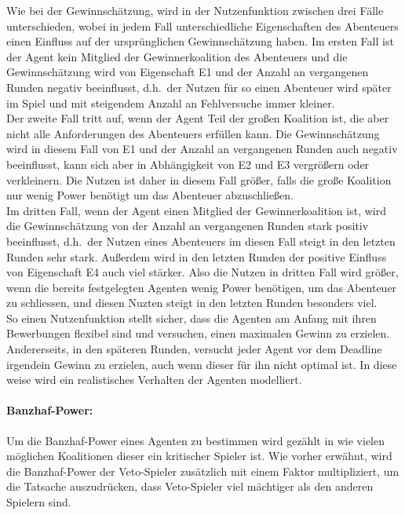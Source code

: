 \documentclass[fleqn,10pt]{article} %
\begin{document}
Wie bei der Gewinnschätzung, wird in der Nutzenfunktion zwischen drei Fälle unterschieden, wobei in jedem Fall unterschiedliche Eigenschaften des Abenteuers einen Einfluss auf der ursprünglichen Gewinnschätzung haben. Im ersten Fall ist der Agent kein Mitglied der Gewinnerkoalition des Abenteuers und die Gewinnschätzung wird von Eigenschaft E1 und der Anzahl an vergangenen Runden negativ beeinflusst, d.h.\ der Nutzen für so einen Abenteuer wird später im Spiel und mit steigendem Anzahl an Fehlversuche immer kleiner. \\
Der zweite Fall tritt auf, wenn der Agent Teil der großen Koalition ist, die aber nicht alle Anforderungen des Abenteuers erfüllen kann. Die Gewinnschätzung wird in diesem Fall von E1 und der Anzahl an vergangenen Runden auch negativ beeinflusst, kann sich aber in Abhängigkeit von E2 und E3 vergrößern oder verkleinern. Die Nutzen ist daher in diesem Fall größer, falls die große Koalition nur wenig Power benötigt um das Abenteuer abzuschließen. \\
Im dritten Fall, wenn der Agent einen Mitglied der Gewinnerkoalition ist, wird die Gewinnschätzung von der Anzahl an vergangenen Runden stark positiv beeinflusst, d.h.\ der Nutzen eines Abenteuers im diesen Fall steigt in den letzten Runden sehr stark. Außerdem wird in den letzten Runden der positive Einfluss von Eigenschaft E4 auch viel stärker. Also die Nutzen in dritten Fall wird größer, wenn die bereits festgelegten Agenten wenig Power benötigen, um das Abenteuer zu schliessen, und diesen Nuzten steigt in den letzten Runden besonders viel.\\
So einen Nutzenfunktion stellt sicher, dass die Agenten am Anfang mit ihren Bewerbungen flexibel sind und versuchen, einen maximalen Gewinn zu erzielen. Andererseits, in den späteren Runden, versucht jeder Agent vor dem Deadline irgendein Gewinn zu erzielen, auch wenn dieser für ihn nicht optimal ist. In diese weise wird ein realistisches Verhalten der Agenten modelliert. 


\paragraph{Banzhaf-Power:}
Um die Banzhaf-Power eines Agenten zu bestimmen wird gezählt in wie vielen möglichen Koalitionen dieser ein kritischer Spieler ist. Wie vorher erwähnt, wird die Banzhaf-Power der Veto-Spieler zusätzlich mit einem Faktor multipliziert, um die Tatsache auszudrücken, dass Veto-Spieler viel mächtiger als den anderen Spielern sind.
\end{document}
